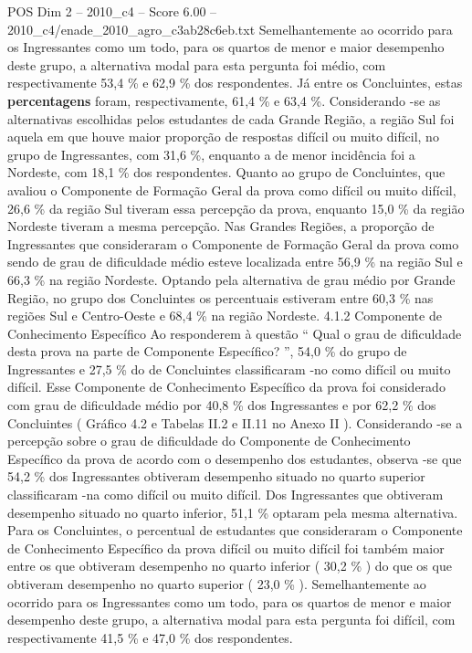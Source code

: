 \begin{textsample}{POS Dim 2 – 2010\_c4 – Score 6.00 – 2010\_c4/enade\_2010\_agro\_c3ab28c6eb.txt}
Semelhantemente ao ocorrido para os Ingressantes como um todo, para os quartos de menor e maior desempenho deste grupo, a alternativa modal para esta pergunta foi médio, com respectivamente 53,4 \% e 62,9 \% dos respondentes.
Já entre os Concluintes, estas \textbf{percentagens} foram, respectivamente, 61,4 \% e 63,4 \%.
Considerando -se as alternativas escolhidas pelos estudantes de cada Grande Região, a região Sul foi aquela em que houve maior proporção de respostas difícil ou muito difícil, no grupo de Ingressantes, com 31,6 \%, enquanto a de menor incidência foi a Nordeste, com 18,1 \% dos respondentes.
Quanto ao grupo de Concluintes, que avaliou o Componente de Formação Geral da prova como difícil ou muito difícil, 26,6 \% da região Sul tiveram essa percepção da prova, enquanto 15,0 \% da região Nordeste tiveram a mesma percepção.
Nas Grandes Regiões, a proporção de Ingressantes que consideraram o Componente de Formação Geral da prova como sendo de grau de dificuldade médio esteve localizada entre 56,9 \% na região Sul e 66,3 \% na região Nordeste.
Optando pela alternativa de grau médio por Grande Região, no grupo dos Concluintes os percentuais estiveram entre 60,3 \% nas regiões Sul e Centro-Oeste e 68,4 \% na região Nordeste. 4.1.2 Componente de Conhecimento Específico Ao responderem à questão “ Qual o grau de dificuldade desta prova na parte de Componente Específico? ”, 54,0 \% do grupo de Ingressantes e 27,5 \% do de Concluintes classificaram -no como difícil ou muito difícil.
Esse Componente de Conhecimento Específico da prova foi considerado com grau de dificuldade médio por 40,8 \% dos Ingressantes e por 62,2 \% dos Concluintes ( Gráfico 4.2 e Tabelas II.2 e II.11 no Anexo II ).
Considerando -se a percepção sobre o grau de dificuldade do Componente de Conhecimento Específico da prova de acordo com o desempenho dos estudantes, observa -se que 54,2 \% dos Ingressantes obtiveram desempenho situado no quarto superior classificaram -na como difícil ou muito difícil.
Dos Ingressantes que obtiveram desempenho situado no quarto inferior, 51,1 \% optaram pela mesma alternativa.
Para os Concluintes, o percentual de estudantes que consideraram o Componente de Conhecimento Específico da prova difícil ou muito difícil foi também maior entre os que obtiveram desempenho no quarto inferior ( 30,2 \% ) do que os que obtiveram desempenho no quarto superior ( 23,0 \% ).
Semelhantemente ao ocorrido para os Ingressantes como um todo, para os quartos de menor e maior desempenho deste grupo, a alternativa modal para esta pergunta foi difícil, com respectivamente 41,5 \% e 47,0 \% dos respondentes.

\end{textsample}
